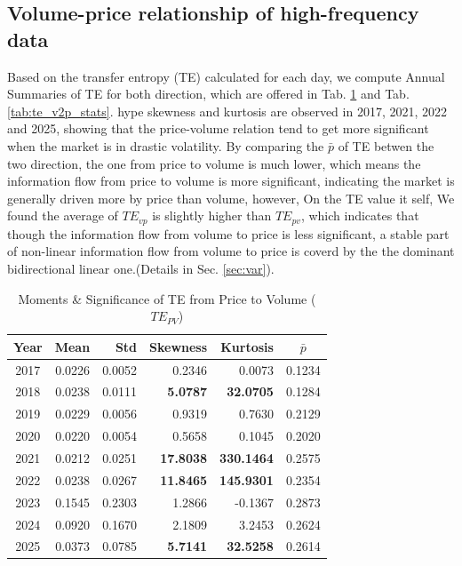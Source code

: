 \documentclass{elsarticle}
\def\rightarrow{}%
\begin{document}
\subsection{Volume-price relationship of high-frequency data}
Based on the transfer entropy (TE) calculated for each day, we compute Annual Summaries of TE for both direction, which are offered in Tab. \ref{tab:te_p2v_stats} and Tab. \ref{tab:te_v2p_stats}. hype skewness and kurtosis are observed in 2017, 2021, 2022 and 2025, showing that the price-volume relation tend to get more significant when the market is in drastic volatility. By comparing the $\bar{p}$ of TE betwen the two direction, the one from price to volume is much lower, which means the information flow from price to volume is more significant, indicating the market is generally driven more by price than volume, however, On the TE value it self, We found the average of $TE_{v \rightarrow p}$ is slightly higher than $TE_{p \rightarrow v}$, which indicates that though the information flow from volume to price is less significant, a stable part of non-linear information flow from volume to price is coverd by the the dominant bidirectional linear one.(Details in Sec. \ref{sec:var}).
\begin{table}[H]
  \caption{Moments \& Significance of TE from Price to Volume ($TE_{P \rightarrow V}$)}
  \label{tab:te_p2v_stats}
  \centering
  \begin{tabular}{crrrrc}
    \hline\noalign{\smallskip}
    \textbf{Year} & \textbf{Mean} & \textbf{Std} & \textbf{Skewness} & \textbf{Kurtosis} & \textbf{$\bar{p}$} \\
    \hline\noalign{\smallskip}
    2017 & 0.0226 & 0.0052 & 0.2346 & 0.0073 & 0.1234 \\
    2018 & 0.0238 & 0.0111 & \textbf{5.0787} & \textbf{32.0705} & 0.1284 \\
    2019 & 0.0229 & 0.0056 & 0.9319 & 0.7630 & 0.2129 \\
    2020 & 0.0220 & 0.0054 & 0.5658 & 0.1045 & 0.2020 \\
    2021 & 0.0212 & 0.0251 & \textbf{17.8038} & \textbf{330.1464} & 0.2575 \\
    2022 & 0.0238 & 0.0267 & \textbf{11.8465} & \textbf{145.9301} & 0.2354 \\
    2023 & 0.1545 & 0.2303 & 1.2866 & -0.1367 & 0.2873 \\
    2024 & 0.0920 & 0.1670 & 2.1809 & 3.2453 & 0.2624 \\
    2025 & 0.0373 & 0.0785 & \textbf{5.7141} & \textbf{32.5258} & 0.2614 \\
    \hline
  \end{tabular}
\end{table}
\end{document}
